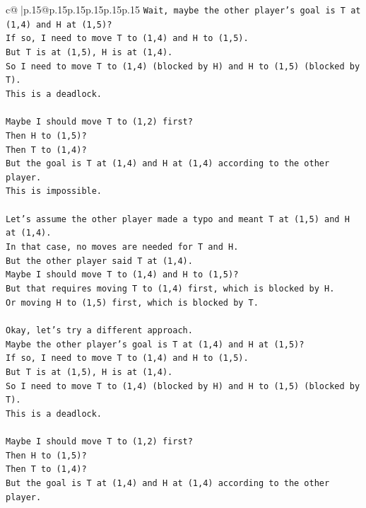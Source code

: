 \documentclass{article}
\begin{document}
{\begin{supertabular}{c@{$\;$}|p{.15\linewidth}@{}p{.15\linewidth}p{.15\linewidth}p{.15\linewidth}p{.15\linewidth}p{.15\linewidth}}
{{{\texttt{Wait, maybe the other player's goal is T at (1,4) and H at (1,5)?} \\
\texttt{If so, I need to move T to (1,4) and H to (1,5).} \\
\texttt{But T is at (1,5), H is at (1,4).} \\
\texttt{So I need to move T to (1,4) (blocked by H) and H to (1,5) (blocked by T).} \\
\texttt{This is a deadlock.} \\
\\ 
\texttt{Maybe I should move T to (1,2) first?} \\
\texttt{Then H to (1,5)?} \\
\texttt{Then T to (1,4)?} \\
\texttt{But the goal is T at (1,4) and H at (1,4) according to the other player.} \\
\texttt{This is impossible.} \\
\\ 
\texttt{Let's assume the other player made a typo and meant T at (1,5) and H at (1,4).} \\
\texttt{In that case, no moves are needed for T and H.} \\
\texttt{But the other player said T at (1,4).} \\
\texttt{Maybe I should move T to (1,4) and H to (1,5)?} \\
\texttt{But that requires moving T to (1,4) first, which is blocked by H.} \\
\texttt{Or moving H to (1,5) first, which is blocked by T.} \\
\\ 
\texttt{Okay, let's try a different approach.} \\
\texttt{Maybe the other player's goal is T at (1,4) and H at (1,5)?} \\
\texttt{If so, I need to move T to (1,4) and H to (1,5).} \\
\texttt{But T is at (1,5), H is at (1,4).} \\
\texttt{So I need to move T to (1,4) (blocked by H) and H to (1,5) (blocked by T).} \\
\texttt{This is a deadlock.} \\
\\ 
\texttt{Maybe I should move T to (1,2) first?} \\
\texttt{Then H to (1,5)?} \\
\texttt{Then T to (1,4)?} \\
\texttt{But the goal is T at (1,4) and H at (1,4) according to the other player.} \\
}}}
\end{supertabular}}
\end{document}
